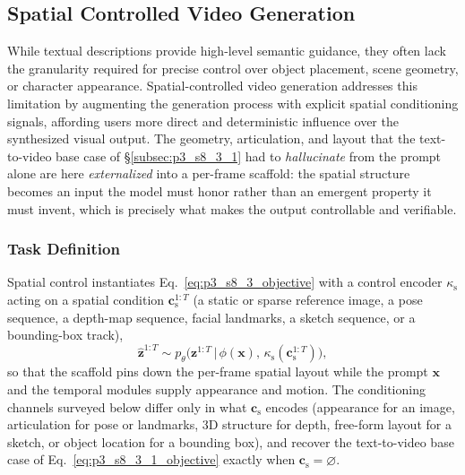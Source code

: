 \subsection{Spatial Controlled Video Generation}
\label{subsec:p3_s8_3_2}

While textual descriptions provide high-level semantic guidance, they often lack the granularity required for precise control over object placement, scene geometry, or character appearance. Spatial-controlled video generation addresses this limitation by augmenting the generation process with explicit spatial conditioning signals, affording users more direct and deterministic influence over the synthesized visual output.
The geometry, articulation, and layout that the text-to-video base case of §\ref{subsec:p3_s8_3_1} had to \emph{hallucinate} from the prompt alone are here \emph{externalized} into a per-frame scaffold: the spatial structure becomes an input the model must honor rather than an emergent property it must invent, which is precisely what makes the output controllable and verifiable.

\subsubsection{Task Definition}
\label{subsubsec:p3_s8_3_2_task}
Spatial control instantiates Eq.~\eqref{eq:p3_s8_3_objective} with a control encoder $\kappa_{\text{s}}$ acting on a spatial condition $\mathbf{c}_{\text{s}}^{1:T}$ (a static or sparse reference image, a pose sequence, a depth-map sequence, facial landmarks, a sketch sequence, or a bounding-box track),
\begin{equation}
\hat{\mathbf{z}}^{1:T}\sim p_\theta\!\big(\mathbf{z}^{1:T}\,\big|\,\phi(\mathbf{x}),\,\kappa_{\text{s}}(\mathbf{c}_{\text{s}}^{1:T})\big),
\label{eq:p3_s8_3_2_objective}
\end{equation}
so that the scaffold pins down the per-frame spatial layout while the prompt $\mathbf{x}$ and the temporal modules supply appearance and motion. The conditioning channels surveyed below differ only in what $\mathbf{c}_{\text{s}}$ encodes (appearance for an image, articulation for pose or landmarks, 3D structure for depth, free-form layout for a sketch, or object location for a bounding box), and recover the text-to-video base case of Eq.~\eqref{eq:p3_s8_3_1_objective} exactly when $\mathbf{c}_{\text{s}}=\varnothing$.

